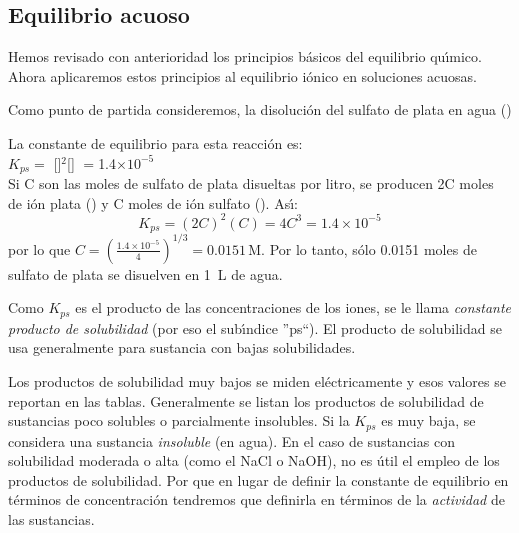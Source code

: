 \subsection{Equilibrio acuoso}
\label{eacuoso}

Hemos revisado con anterioridad los principios b\'asicos del equilibrio qu\'{\i}mico. Ahora aplicaremos estos principios al equilibrio i\'onico en soluciones acuosas.

Como punto de partida consideremos, la disoluci\'on del sulfato de plata en agua ()
 
La constante de equilibrio para esta reacci\'on es:\\[2pt]

\hskip 3cm $K_{ps} = $ []$^2$[] $=$1.4$\times10^{-5}$\\[2pt]

Si C son las moles de sulfato de plata disueltas por litro, se producen 2C moles de i\'on plata () y C moles de i\'on sulfato (). As\'{\i}:
$$K_{ps} = (2C)^2(C) = 4C^3 = 1.4\times10^{-5}$$
por lo que $C = \left(\frac{1.4\times10^{-5}}{4}\right)^{1/3} = 0.0151\,\text{M}$. Por lo tanto, s\'olo 0.0151 moles de sulfato de plata se disuelven en 1~L de agua.

Como $K_{ps}$ es el producto de las concentraciones de los iones, se le llama \emph{constante producto de solubilidad} (por eso el sub\'{\i}ndice ''ps``). El producto de solubilidad se usa generalmente para sustancia con bajas solubilidades. 

Los productos de solubilidad muy bajos se miden el\'ectricamente y esos valores se reportan en las tablas. Generalmente se listan los productos de solubilidad de sustancias poco solubles o parcialmente insolubles. Si la $K_{ps}$ es muy baja, se considera una sustancia \emph{insoluble} (en agua). En el caso de sustancias con solubilidad moderada o alta (como el NaCl o NaOH), no es \'util el empleo de los productos de solubilidad. Por que en lugar de definir  la constante de equilibrio en t\'erminos de concentraci\'on tendremos que definirla en t\'erminos de la \emph{actividad} de las sustancias.


